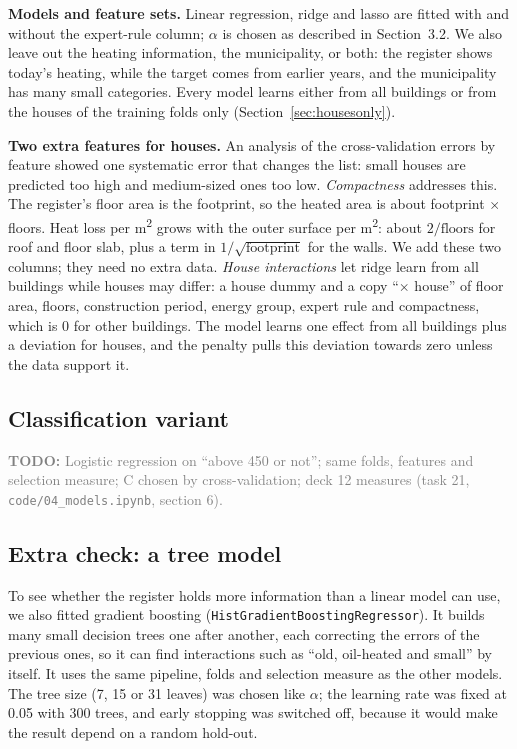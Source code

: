 \documentclass[11pt,a4paper]{article}
\newcommand{\todo}[1]{\noindent\textcolor{gray}{\small\textbf{TODO:} #1}\par\medskip}
\begin{document}
\textbf{Models and feature sets.} Linear regression, ridge and lasso are fitted with and without the expert-rule
column; $\alpha$ is chosen as described in Section~3.2. We also leave out the heating information, the
municipality, or both: the register shows today's heating, while the target comes from earlier years, and the
municipality has many small categories. Every model learns either from all buildings or from the houses of the
training folds only (Section~\ref{sec:housesonly}).

\textbf{Two extra features for houses.} An analysis of the cross-validation errors by feature showed one
systematic error that changes the list: small houses are predicted too high and medium-sized ones too low.
\emph{Compactness} addresses this. The register's floor area is the footprint, so the heated area is about
footprint $\times$ floors. Heat loss per m\textsuperscript{2} grows with the outer surface per
m\textsuperscript{2}: about $2/\text{floors}$ for roof and floor slab, plus a term in $1/\sqrt{\text{footprint}}$
for the walls. We add these two columns; they need no extra data. \emph{House interactions} let ridge learn from
all buildings while houses may differ: a house dummy and a copy ``$\times$ house'' of floor area, floors,
construction period, energy group, expert rule and compactness, which is 0 for other buildings. The model learns
one effect from all buildings plus a deviation for houses, and the penalty pulls this deviation towards zero
unless the data support it.

\subsection{Classification variant}
\todo{Logistic regression on ``above 450 or not''; same folds, features and selection measure; C chosen by
cross-validation; deck 12 measures (task 21, \texttt{code/04\_models.ipynb}, section 6).}

\subsection{Extra check: a tree model}
 To see whether the register holds more information than a linear model can use, we also fitted gradient
boosting (\texttt{HistGradientBoostingRegressor}). It builds many small decision trees one after
another, each correcting the errors of the previous ones, so it can find interactions such as
``old, oil-heated and small'' by itself. It uses the same pipeline, folds and selection measure as
the other models. The tree size (7, 15 or 31 leaves) was chosen like $\alpha$; the learning rate was
fixed at 0.05 with 300 trees, and early stopping was switched off, because it would make the result
depend on a random hold-out.
\end{document}
